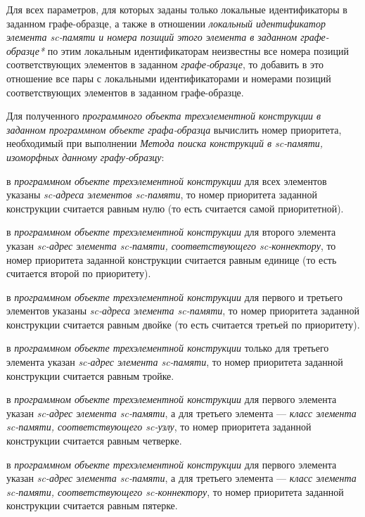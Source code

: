 \begin{textitemize}
	\item Для всех параметров, для которых заданы только локальные идентификаторы в заданном графе-образце, а также в отношении \textit{локальный идентификатор элемента sc-памяти и номера позиций этого элемента в заданном графе-образце*} по этим локальным идентификаторам неизвестны все номера позиций соответствующих элементов в заданном \textit{графе-образце}, то добавить в это отношение все пары с локальными идентификаторами и номерами позиций соответствующих элементов в заданном графе-образце.
	\item Для полученного \textit{программного объекта трехэлементной конструкции в заданном программном объекте графа-образца} вычислить номер приоритета, необходимый при выполнении \textit{Метода поиска конструкций в sc-памяти, изоморфных данному графу-образцу}:
	\begin{textitemize}
		\item {} в \textit{программном объекте трехэлементной конструкции} для всех элементов указаны \textit{sc-адреса элементов sc-памяти}, то номер приоритета заданной конструкции считается равным нулю (то есть считается самой приоритетной).
		\item {} в \textit{программном объекте трехэлементной конструкции} для второго элемента указан \textit{sc-адрес элемента sc-памяти, соответствующего sc-коннектору}, то номер приоритета заданной конструкции считается равным единице (то есть считается второй по приоритету).
		\item {} в \textit{программном объекте трехэлементной конструкции} для первого и третьего элементов указаны \textit{sc-адреса элемента sc-памяти}, то номер приоритета заданной конструкции считается равным двойке (то есть считается третьей по приоритету).
		\item {} в \textit{программном объекте трехэлементной конструкции} только для третьего элемента указан \textit{sc-адрес элемента sc-памяти}, то номер приоритета заданной конструкции считается равным тройке.
		\item {} в \textit{программном объекте трехэлементной конструкции} для первого элемента указан \textit{sc-адрес элемента sc-памяти}, а для третьего элемента --- \textit{класс элемента sc-памяти, соответствующего sc-узлу\scnsupergroupsign}, то номер приоритета заданной конструкции считается равным четверке.
		\item {} в \textit{программном объекте трехэлементной конструкции} для первого элемента указан \textit{sc-адрес элемента sc-памяти}, а для третьего элемента --- \textit{класс элемента sc-памяти, соответствующего sc-коннектору\scnsupergroupsign}, то номер приоритета заданной конструкции считается равным пятерке.

\end{textitemize}
\end{textitemize}
